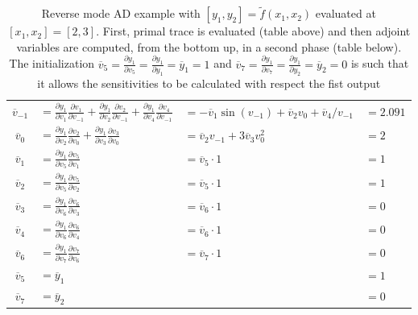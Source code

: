 \begin{table}
\begin{tabular}{clll}
			\midrule
			$\overline{v}_{-1}$  &  $=\frac{\partial y_1}{\partial v_1} \frac{\partial v_1}{\partial v_{-1}} + \frac{\partial y_1}{\partial v_2} \frac{\partial v_2}{\partial v_{-1}} + \frac{\partial y_1}{\partial v_4} \frac{\partial v_4}{\partial v_{-1}}$  &  $=-\overline{v}_1 \sin (v_{-1}) + \overline{v}_2 v_0 + \overline{v}_4/v_{-1}$  &  $=2.091$  \\[2ex]
			$\overline{v}_0$	 &  $=\frac{\partial y_1}{\partial v_2} \frac{\partial v_2}{\partial v_0} + \frac{\partial y_1}{\partial v_3} \frac{\partial v_3}{\partial v_0}$  & $=\overline{v}_2 v_{-1} + 3 \overline{v}_3 v_0^2$  &  $=2$  \\[2ex]
			$\overline{v}_1$	 &  $=\frac{\partial y_1}{\partial v_5} \frac{\partial v_5}{\partial v_1}$  &  $=\overline{v}_5 \cdot 1$  &  $=1$  \\[2ex]
			$\overline{v}_2$	 &  $=\frac{\partial y_1}{\partial v_5} \frac{\partial v_5}{\partial v_2}$  &  $=\overline{v}_5 \cdot 1$  &  $=1$  \\[2ex]
			$\overline{v}_3$	 &  $=\frac{\partial y_1}{\partial v_6} \frac{\partial v_6}{\partial v_3}$  &  $=\overline{v}_6 \cdot 1$  &  $=0$  \\[2ex]
			$\overline{v}_4$	 &  $=\frac{\partial y_1}{\partial v_6} \frac{\partial v_6}{\partial v_4}$  &  $=\overline{v}_6 \cdot 1$  &  $=0$  \\[2ex]
			$\overline{v}_6$	 &  $=\frac{\partial y_1}{\partial v_7} \frac{\partial v_7}{\partial v_6}$  &  $=\overline{v}_7 \cdot 1$  &  $=0$  \\[2ex]
			
			\midrule
			$\overline{v}_5$  &  $=\overline{y}_1$	&  &  $=1$	\\
			$\overline{v}_7$  &  $=\overline{y}_2$  &  &  $=0$	\\
			\bottomrule
		\end{tabular}
	\caption {Reverse mode AD example with $[y_1, y_2] = \tilde{f}(x_1, x_2)$ evaluated at $[x_1, x_2] = [2,3]$. First, primal trace is evaluated (table above) and then adjoint variables are computed, from the  bottom up, in a second phase (table below). The initialization $\overline{v}_5 = \frac{\partial y_1}{\partial v_5} = \frac{\partial y_1}{\partial y_1} = \overline{y}_1 = 1$ and $\overline{v}_7 = \frac{\partial y_1}{\partial v_7} = \frac{\partial y_1}{\partial y_2} = \overline{y}_2 = 0$ is such that it allows the sensitivities to be calculated with respect the fist output}
	\label{tab:reverse_AD_example}
\end{table}

